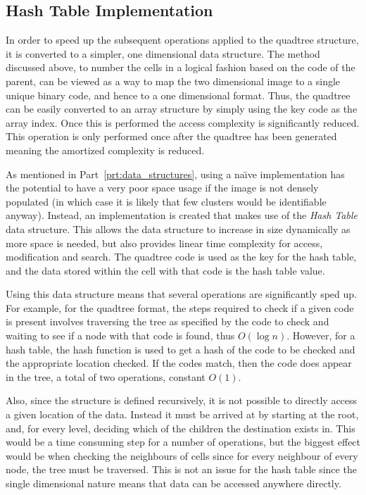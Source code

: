 \subsection{Hash Table Implementation}
\label{sub:hash_table_implementation}

In order to speed up the subsequent operations applied to the quadtree
structure, it is converted to a simpler, one dimensional data structure. The
method discussed above, to number the cells in a logical fashion based on the
code of the parent, can be viewed as a way to map the two dimensional image to
a single unique binary code, and hence to a one dimensional format. Thus, the
quadtree can be easily converted to an array structure by simply using the key
code as the array index. Once this is performed the access complexity is
significantly reduced. This operation is only performed once after the quadtree
has been generated meaning the amortized complexity is reduced.

As mentioned in Part~\ref{prt:data_structures}, using a na\"{\i}ve
implementation has the potential to have a very poor space usage if the image
is not densely populated (in which case it is likely that few clusters would be
identifiable anyway). Instead, an implementation is created that makes use of
the \emph{Hash Table} data structure\cite{cormen2001introduction}. This allows
the data structure to increase in size dynamically as more space is needed, but
also provides linear time complexity for access, modification and search. The
quadtree code is used as the key for the hash table, and the data stored within
the cell with that code is the hash table value.

Using this data structure means that several operations are significantly sped
up. For example, for the quadtree format, the steps required to check if a
given code is present involves traversing the tree as specified by the code to
check and waiting to see if a node with that code is found, thus $O(\log n)$.
However, for a hash table, the hash function is used to get a hash of the code
to be checked and the appropriate location checked. If the codes match, then
the code does appear in the tree, a total of two operations, constant $O(1)$.

Also, since the structure is defined recursively, it is not possible to
directly access a given location of the data. Instead it must be arrived at by
starting at the root, and, for every level, deciding which of the children the
destination exists in. This would be a time consuming step for a number of
operations, but the biggest effect would be when checking the neighbours of
cells since for every neighbour of every node, the tree must be traversed. This
is not an issue for the hash table since the single dimensional nature means
that data can be accessed anywhere directly.

